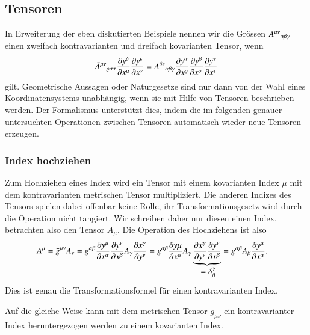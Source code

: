 \subsection{Tensoren}
In Erweiterung der eben diskutierten Beispiele nennen wir die Grössen
$
A^{\mu\nu}\mathstrut_{\alpha\beta\gamma}
$
einen zweifach kontravarianten und dreifach kovarianten Tensor, wenn
\[
\bar 
A^{\mu\nu}\mathstrut_{\varrho\sigma\tau}
\frac{\partial y^\delta}{\partial x^\mu}
\frac{\partial y^\epsilon}{\partial x^\nu}
=
A^{\delta\epsilon}\mathstrut_{\alpha\beta\gamma}
\frac{\partial y^\alpha}{\partial x^\varrho}
\frac{\partial y^\beta}{\partial x^\sigma}
\frac{\partial y^\gamma}{\partial x^\tau}
\]
gilt.
Geometrische Aussagen oder Naturgesetze sind nur dann von der Wahl
eines Koordinatensystems unabhängig, wenn sie mit Hilfe von Tensoren
beschrieben werden.
Der Formalismus unterstützt dies, indem die im folgenden genauer
untersuchten Operationen zwischen Tensoren automatisch wieder neue
Tensoren erzeugen.

\subsubsection{Index hochziehen}
Zum {\index Hochziehen eines Index} wird ein Tensor mit einem kovarianten
Index $\mu$ mit dem kontravarianten metrischen Tensor multipliziert.
Die anderen Indizes des Tensors spielen dabei offenbar keine Rolle,
ihr Transformationsgesetz wird durch die Operation nicht tangiert.
Wir schreiben daher nur diesen einen Index, betrachten also den Tensor
$A_\mu$.
Die Operation des Hochziehens ist also
\begin{align*}
\bar A^\mu
=
\bar g^{\mu\nu}\bar A_\nu
&=
g^{\alpha\beta}
\frac{\partial y^\mu}{\partial x^\alpha}
\frac{\partial y^\nu}{\partial x^\beta}
A_\gamma
\frac{\partial x^\gamma}{\partial y^\nu}
=
g^{\alpha\beta}
\frac{\partial y\mu}{\partial x^\alpha}
A_\gamma
\underbrace{
\frac{\partial x^\gamma}{\partial y^\nu}
\frac{\partial y^\nu}{\partial x^\beta}
}_{\displaystyle \mathstrut= \delta^\gamma_\beta}
=
g^{\alpha\beta}
A_\beta
\frac{\partial y^\mu}{\partial x^\alpha}.
\end{align*}
Dies ist genau die Transformationsformel für einen kontravarianten Index.

Auf die gleiche Weise kann mit dem metrischen Tensor $g_{\mu\nu}$ ein
kontravarianter Index heruntergezogen werden zu einem kovarianten Index.

